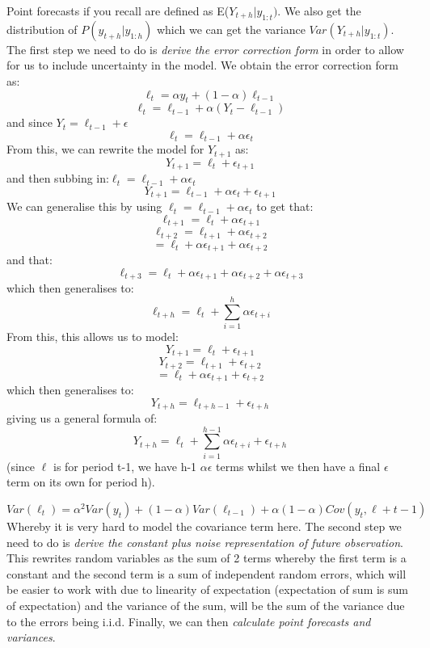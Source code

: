 \documentclass[11pt, oneside]{article}
\theoremstyle{definition}
\begin{document}
Point forecasts if you recall are defined as E($Y_{t+h}|y_{1:t})$. We also get the distribution of $P(y_{t+h}|y_{1:h})$ which we can get the variance $Var(Y_{t+h}|y_{1:t})$. The first step we need to do is \textit{derive the error correction form} in order to allow for us to include uncertainty in the model. We obtain the error correction form as:
$$
\ell_t = \alpha y_t + (1-\alpha)\ell_{t-1}
$$
$$
\ell_t = \ell_{t-1} + \alpha(Y_t - \ell_{t-1})
$$
and since $Y_t = \ell_{t-1}+\epsilon$
$$
\ell_t = \ell_{t-1} + \alpha \epsilon_t
$$
From this, we can rewrite the model for $Y_{t+1}$ as:
$$
Y_{t+1} = \ell_{t} + \epsilon_{t+1}
$$
and then subbing in:$\ell_t = \ell_{t-1} + \alpha \epsilon_t$
$$
Y_{t+1} = \ell_{t-1} + \alpha \epsilon_t + \epsilon_{t+1}
$$
We can generalise this by using $\ell_t = \ell_{t-1} + \alpha \epsilon_t$ to get that:
$$
\ell_{t+1} = \ell_t + \alpha \epsilon_{t+1}
$$
$$
\ell_{t+2} = \ell_{t+1} + \alpha \epsilon_{t+2}
$$
$$
= \ell_t + \alpha \epsilon_{t+1} + \alpha \epsilon_{t+2}
$$
and that:
$$
\ell_{t+3}= \ell_t + \alpha \epsilon_{t+1} + \alpha \epsilon_{t+2} + \alpha \epsilon_{t+3}
$$
which then generalises to:
$$
\ell_{t+h} = \ell_t + \sum\limits_{i=1}^h \alpha\epsilon_{t+i}
$$
From this, this allows us to model:
$$
Y_{t+1} = \ell_t + \epsilon_{t+1}
$$
$$
Y_{t+2} = \ell_{t+1} + \epsilon_{t+2}
$$
$$
= \ell_t + \alpha \epsilon_{t+1} + \epsilon_{t+2}
$$
which then generalises to:
$$
Y_{t+h} = \ell_{t+h-1} + \epsilon_{t+h}
$$
giving us a general formula of:
$$
Y_{t+h} = \ell_{t} + \sum\limits_{i=1}^{h-1}\alpha \epsilon_{t+i} + \epsilon_{t+h}
$$
(since $\ell$ is for period t-1, we have h-1 $\alpha \epsilon$ terms whilst we then have a final $\epsilon$ term on its own for period h).

$$
Var(\ell_t) = \alpha^2Var(y_t) + (1-\alpha)Var(\ell_{t-1}) + \alpha(1-\alpha)Cov(y_t,\ell+{t-1})
$$
Whereby it is very hard to model the covariance term here. The second step we need to do is \textit{derive the constant plus noise representation of future observation}. This rewrites random variables as the sum of 2 terms whereby the first term is a constant and the second term is a sum of independent random errors, which will be easier to work with due to linearity of expectation (expectation of sum is sum of expectation) and the variance of the sum, will be the sum of the variance due to the errors being i.i.d. Finally, we can then \textit{calculate point forecasts and variances}.
\end{document}
